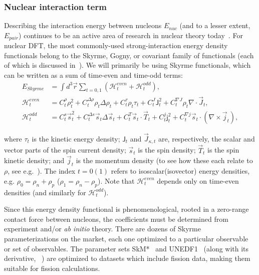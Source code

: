 \subsubsection{Nuclear interaction term}\label{sect:skyrmeterm}
Describing the interaction energy between nucleons $E_{nuc}$ (and to a lesser extent, $E_{pair}$) continues to be an active area of research in nuclear theory today~\cite{Machleidt2011,Machleidt2016,Epelbaum2009,Detmold2015,Stroberg2019}. For nuclear DFT, the most commonly-used strong-interaction energy density functionals belong to the Skyrme, Gogny, or covariant family of functionals (each of which is discussed in~\cite{bender2003}). We will primarily be using Skyrme functionals, which can be written as a sum of time-even and time-odd terms:
\begin{align}
E_{Skyrme} &= \int d^3\vec{r} \sum_{t=0,1} \left( \mathcal{H}^{even}_t + \mathcal{H}^{odd}_t \right),\\
\mathcal{H}^{even}_t &= C^\rho_t\rho_t^2 + C_t^{\Delta\rho}\rho_t\Delta\rho_t + C^\tau_t\rho_t\tau_t + C^J_t\mathsf{J}^2_t + C^{\nabla J}_t\rho_t\nabla\cdot\vec{J}_t, \\
\mathcal{H}^{odd}_t &= C^s_t \vec{s}_t^2 + C_t^{\Delta s}\vec{s}_t\Delta\vec{s}_t + C^T_t\vec{s}_t\cdot\vec{T}_t + C^j_t\mathsf{j}^2_t + C^{\nabla j}_t\vec{s}_t\cdot(\nabla\times\vec{j}_t),
\end{align}

\noindent where $\tau_t$ is the kinetic energy density; $\mathsf{J}_t$ and $\vec{J}_{\kappa,t}$ are, respectively, the scalar and vector parts of the spin current density; $\vec{s}_t$ is the spin density; $\vec{T}_t$ is the spin kinetic density; and $\vec{j}_t$ is the momentum density (to see how these each relate to $\rho$, see e.g.~\cite{bender2003}). The index $t=0(1)$ refers to isoscalar(isovector) energy densities, e.g. $\rho_0 = \rho_n + \rho_p$ ($\rho_1 = \rho_n - \rho_p$). Note that $\mathcal{H}^{even}_t$ depends only on time-even densities (and similarly for $\mathcal{H}^{odd}_t$).

Since this energy density functional is phenomenological, rooted in a zero-range contact force between nucleons, the coefficients must be determined from experiment and/or \textit{ab initio} theory. There are dozens of Skyrme parameterizations on the market, each one optimized to a particular observable or set of observables. The parameter sets SkM*~\cite{Bartel1982} and UNEDF1~\cite{Kortelainen2012} (along with its derivative, {\hfb}~\cite{Schunck2015}) are optimized to datasets which include fission data, making them suitable for fission calculations.

